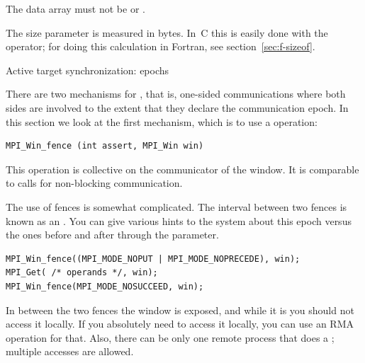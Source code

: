 %
The data array must not be  or .

The size parameter is measured in bytes. In~C this is easily done
with the  operator;
for doing this calculation in Fortran, see section~\ref{sec:f-sizeof}.

 {Active target synchronization: epochs}
\label{sec:fence}

There are two mechanisms for , that is,
one-sided communications where both sides are involved to the extent that they declare
the communication epoch. In this section we look at the first mechanism,
which is to use a  operation:
\begin{verbatim}
MPI_Win_fence (int assert, MPI_Win win)
\end{verbatim}
This operation is collective on the communicator of the window.
It is comparable to  calls for non-blocking communication.

The use of fences is somewhat complicated. The interval between two fences
is known as an .
You can give various hints to the system about this epoch versus the ones
before and after through the  parameter.
\begin{verbatim}
MPI_Win_fence((MPI_MODE_NOPUT | MPI_MODE_NOPRECEDE), win);
MPI_Get( /* operands */, win);
MPI_Win_fence(MPI_MODE_NOSUCCEED, win);
\end{verbatim}
In between the two fences the window is exposed, and while it is you
should not access it locally. If you absolutely need to access it
locally, you can use an \ac{RMA} operation for that. Also, there can be only one
remote process that does a ; multiple  accesses are allowed.

